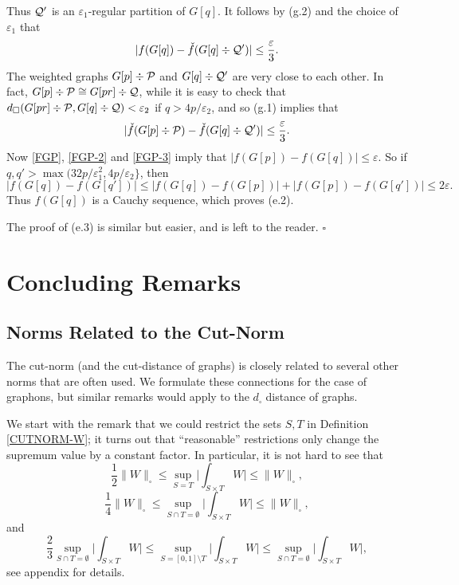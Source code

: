 \documentclass[12pt]{article}
\numberwithin{equation}{section}
\def\eps{\varepsilon}
\def\PP{{\cal P}}\def\QQ{{\cal Q}}\def\RR{{\cal R}}
\begin{document}
Thus $\QQ'$ is an $\eps_1$-regular  partition of $G[q]$. It follows
by (g.2) and the choice of $\eps_1$ that
\begin{equation}\label{FGP-2}
|f(G[q])-\check{f}(G[q]\div\QQ')|\le \frac{\eps}{3}.
\end{equation}
The weighted graphs $G[p]\div\PP$ and $G[q]\div\QQ'$ are very close
to each other. In fact, $G[p]\div\PP\cong G[pr]\div\QQ$, while it is
easy to check that $d_\square(G[pr]\div\PP, G[q]\div\QQ)<\eps_2$ if
$q>4p/\eps_2$, and so (g.1) implies that
\begin{equation}\label{FGP-3}
|\check{f}(G[p]\div\PP)-\check{f}(G[q]\div\QQ')|\le\frac{\eps}{3}.
\end{equation}
Now \eqref{FGP}, \eqref{FGP-2} and \eqref{FGP-3} imply that
$|f(G[p])-f(G[q])|\le\eps$. So if
$q,q'>\max(32p/\eps_1^2,4p/\eps_2\}$, then
\[
|f(G[q])-f(G[q'])|\le |f(G[q])-f(G[p])|+|f(G[p])-f(G[q'])|\le 2\eps.
\]
Thus $f(G[q])$ is a Cauchy sequence, which proves (e.2).

The proof of (e.3) is similar but easier, and is left to the
reader.  \hfill$\square$

\section{Concluding Remarks}
\label{sec:remarks}


\subsection{Norms Related to the Cut-Norm}\label{MORE-NORMS}

The cut-norm (and the cut-distance of graphs) is closely related to
several other norms that are often used. We formulate these
connections for the case of graphons, but similar remarks would
apply to the $d_\square$ distance of graphs.


We start with the remark that we could restrict the sets $S,T$ in
Definition \ref{CUTNORM-W}; it turns out that ``reasonable''
restrictions only change the supremum value by a constant factor. In
particular, it is not hard to see that
\begin{equation}\label{SQUARE-SS}
\frac{1}{2}\|W\|_\square
\le \sup_{S=T}\biggl|\int_{S\times T}
W\biggr| \le \|W\|_\square,
\end{equation}
\begin{equation}\label{SQUARE-ST-DISJ}
\frac{1}{4} \|W\|_\square
\le \sup_{S\cap T=\emptyset}\biggl|\int_{S\times T}
W\biggr|
\le \|W\|_\square,
\end{equation}
and
\begin{equation}\label{SQUARE-ST-COMPL}
{\frac{2}{3} \sup_{S\cap T=\emptyset}
\biggl|\int_{S\times T} W\biggr|
\le\sup_{S=[0,1]\setminus T}\biggl|\int_{S\times T} W\biggr|
\le \sup_{S\cap T=\emptyset}\biggl|\int_{S\times T} W\biggr|,}
\end{equation}
see appendix for  details.
\end{document}
